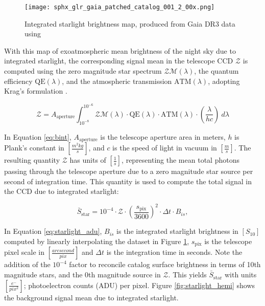 \begin{figure}[ht]
  \centering
  \texttt{[image: sphx\_glr\_gaia\_patched\_catalog\_001\_2\_00x.png]}
  \caption{Integrated starlight brightness map, produced from Gaia DR3 data \cite{gaia_dr3} using \cite{astroquery_gaia}}
  \label{fig:gaiapatched}
\end{figure}

With this map of exoatmospheric mean brightness of the night sky due to integrated
starlight, the corresponding signal mean in the telescope CCD $\mathcal{Z}$ is computed using the zero magnitude star spectrum $\mathcal{ZM}(\lambda)$, the quantum efficiency $\textrm{QE}(\lambda)$, and the atmospheric transmission $\textrm{ATM}(\lambda)$, adopting Krag's formulation \cite{krag2003}.

\begin{equation} \label{eq:bint}
 \mathcal{Z} = A_\mathrm{aperture}
  \int_{10^{-8}}^{10^{-6}}{ \mathcal{ZM}(\lambda) \cdot \textrm{QE}(\lambda) \cdot \textrm{ATM}(\lambda)
  \cdot \left( \frac{\lambda}{h c} \right) \: d\lambda}  
\end{equation}

In Equation \ref{eq:bint}, $A_\mathrm{aperture}$ is the telescope aperture area in meters, $h$ is Plank's constant in $\left[ \frac{m^2 kg}{s} \right]$, and $c$ is the speed of light in vacuum in $\left[ \frac{m}{s} \right]$. The resulting quantity $\mathcal{Z}$ has units of $\left[ \frac{1}{s} \right]$, representing the mean total photons passing through the telescope aperture due to a zero magnitude star source per second of integration time. This quantity is used to compute the total signal in the CCD due to integrated starlight:

\begin{equation} \label{eq:starlight_adu}
  \bar{S}_\mathrm{star} = 10^{-4} \cdot \mathcal{Z} \cdot \left( \frac{s_\mathrm{pix}}{3600} \right)^2 \cdot \Delta t \cdot
  B_{is},
\end{equation}

In Equation \ref{eq:starlight_adu}, $B_{is}$ is the integrated starlight brightness in $\left[ S_{10}\right]$ computed by linearly interpolating the dataset in Figure \ref{fig:gaiapatched}, $s_\mathrm{pix}$ is the telescope pixel scale in $\left[ \frac{arcsecond}{pix} \right]$ and $\Delta t$ is the integration time in seconds. Note the addition of the $10^{-4}$ factor to reconcile catalog surface brightness in terms of 10th magnitude stars, and the 0th magnitude source in $\mathcal{Z}$. This yields $\bar{S}_\mathrm{star}$ with units $\left[ \frac{e^-}{pix^2} \right]$; photoelectron counts (ADU) per pixel. Figure \ref{fig:starlight_hemi} shows the background signal mean due to integrated starlight.

